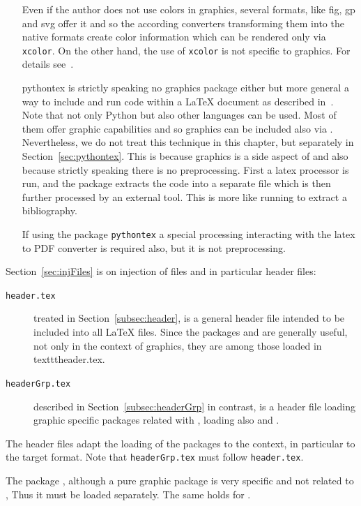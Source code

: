 \begin{itemize}
Even if the author does not use colors in graphics, 
several formats, like \gls{fig}, \gls{gp} and \gls{svg} 
offer it and so the according converters 
transforming them into the native formats 
create color information which can be rendered only via \texttt{xcolor}. 
On the other hand, the use of \texttt{xcolor} is not specific to graphics. 
For details see~\cite{XColorP}. 
\item[pythontex]
is strictly speaking no graphics package either but more general 
a way to include and run code within a \LaTeX{} document 
as described in~\cite{PythonTexP}. 
Note that not only Python but also other languages can be used. 
Most of them offer graphic capabilities 
and so graphics can be included also via . 
Nevertheless, we do not treat this technique in this chapter, 
but separately in Section~\ref{sec:pythontex}. 
This is because graphics is a side aspect of  
and also because strictly speaking there is no preprocessing. 
First a latex processor is run, and the package extracts the code 
into a separate file which is then further processed by an external tool. 
This is more like running  to extract a bibliography. 

If using the package \texttt{pythontex} 
a special processing interacting with the latex to PDF converter is required also, 
but it is not preprocessing. 
\end{itemize}

Section~\ref{sec:injFiles} is on injection of files 
and in particular header files: 
%
\begin{description}
  \item[\texttt{header.tex}] treated in Section~\ref{subsec:header}, 
  is a general header file intended to be included into all \LaTeX{} files. 
  Since the packages  and  are generally useful, 
  not only in the context of graphics, they are among those loaded in texttt{header.tex}. 
  \item[\texttt{headerGrp.tex}] described in Section~\ref{subsec:headerGrp} in contrast, 
  is a header file loading graphic specific packages related with , 
  loading also  and . 
\end{description}

The header files adapt the loading of the packages to the context, 
in particular to the target format. 
Note that \texttt{headerGrp.tex} must follow \texttt{header.tex}. 

The package , although a pure graphic package 
is very specific and not related to , 
Thus it must be loaded separately. The same holds for . 

